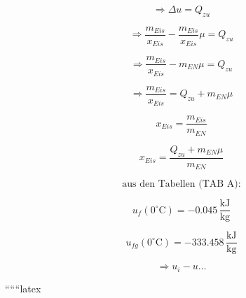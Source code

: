 \[
\Rightarrow \Delta u = Q_{zu}
\]

\[
\Rightarrow \frac{m_{Eis}}{x_{Eis}} - \frac{m_{Eis}}{x_{Eis}} \mu = Q_{zu}
\]

\[
\Rightarrow \frac{m_{Eis}}{x_{Eis}} - m_{EN} \mu = Q_{zu}
\]

\[
\Rightarrow \frac{m_{Eis}}{x_{Eis}} = Q_{zu} + m_{EN} \mu
\]

\[
x_{Eis} = \frac{m_{Eis}}{m_{EN}}
\]

\[
x_{Eis} = \frac{Q_{zu} + m_{EN} \mu}{m_{EN}}
\]

\[
\text{aus den Tabellen (TAB A):}
\]

\[
u_f (0^\circ \text{C}) = -0.045 \, \frac{\text{kJ}}{\text{kg}}
\]

\[
u_{fg} (0^\circ \text{C}) = -333.458 \, \frac{\text{kJ}}{\text{kg}}
\]

\[
\Rightarrow u_i - u \ldots
\]

``````latex